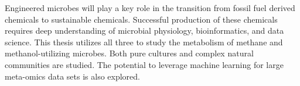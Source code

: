 Engineered microbes will play a key role in the transition from fossil fuel derived chemicals to sustainable chemicals.
Successful production of these chemicals requires deep understanding of microbial physiology, bioinformatics, and data science.
This thesis utilizes all three to study the metabolism of methane and methanol-utilizing microbes.
Both pure cultures and complex natural communities are studied.
The potential to leverage machine learning for large meta-omics data sets is also explored.


